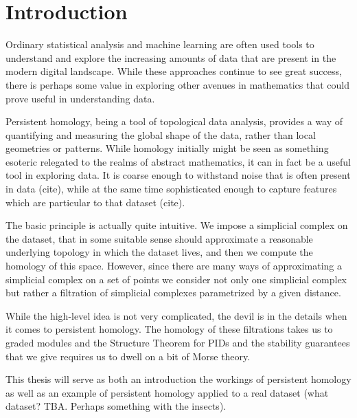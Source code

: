 \chapter{Introduction}
Ordinary statistical analysis and machine learning are often used tools to understand and explore the increasing amounts of data that are present in the modern digital landscape. While these approaches continue to see great success, there is perhaps some value in exploring other avenues in mathematics that could prove useful in understanding data.

Persistent homology, being a tool of topological data analysis, provides a way of quantifying and measuring the global shape of the data, rather than local geometries or patterns. While homology initially might be seen as something esoteric relegated to the realms of abstract mathematics, it can in fact be a useful tool in exploring data. It is coarse enough to withstand noise that is often present in data (cite), while at the same time sophisticated enough to capture features which are particular to that dataset (cite).

The basic principle is actually quite intuitive. We impose a simplicial complex on the dataset, that in some suitable sense should approximate a reasonable underlying topology in which the dataset lives, and then we compute the homology of this space. However, since there are many ways of approximating a simplicial complex on a set of points we consider not only one simplicial complex but rather a filtration of simplicial complexes parametrized by a given distance.

While the high-level idea is not very complicated, the devil is in the details when it comes to persistent homology. The homology of these filtrations takes us to graded modules and the Structure Theorem for PIDs and the stability guarantees that we give requires us to dwell on a bit of Morse theory.

This thesis will serve as both an introduction the workings of persistent homology as well as an example of persistent homology applied to a real dataset (what dataset? TBA. Perhaps something with the insects).



